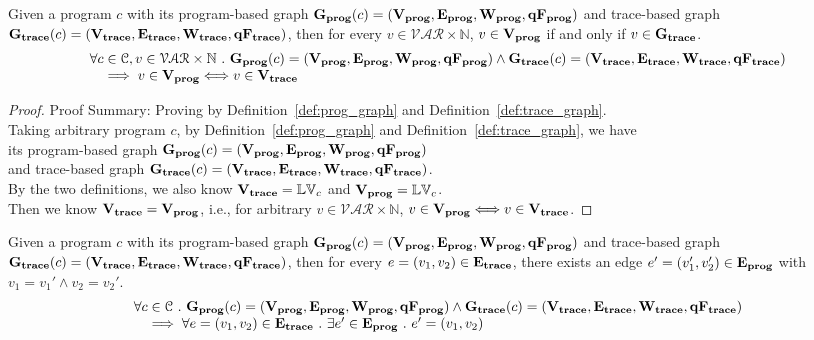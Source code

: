 	\begin{lem}
	\label{lem:vertex_map}
	Given a program $c$ with its
	program-based graph $\progG({c}) = (\progV, \progE, \progW, \progF)$
	and 
	trace-based graph $\traceG({c}) = (\traceV, \traceE, \traceW, \traceF)$,
	then for every $v \in \mathcal{VAR} \times \mathbb{N}$,
	$v \in \progV$ if and only if $v \in \traceG$.
	\[
	\begin{array}{l}
	\forall c \in \cdom , v \in \mathcal{VAR} \times \mathbb{N} \st 
	\progG({c}) = (\progV, \progE, \progW, \progF)
	\land 
	\traceG({c}) = (\traceV, \traceE, \traceW, \traceF)
	\\ \quad
	\implies
	v \in \progV \Longleftrightarrow v \in \traceV
	\end{array}
	\]
	\end{lem}
\begin{proof}
Proof Summary: Proving by Definition~\ref{def:prog_graph} and Definition~\ref{def:trace_graph}.
\\
Taking arbitrary program $c$,
by Definition~\ref{def:prog_graph} and Definition~\ref{def:trace_graph}, 
we have   
\\
its program-based graph $\progG({c}) = (\progV, \progE, \progW, \progF)$ 
\\
and 
trace-based graph $\traceG({c}) = (\traceV, \traceE, \traceW, \traceF)$.
\\
By the two definitions, we also know 
$\traceV  = \lvar_c$ and $\progV = \lvar_c$.
\\
Then we know $\traceV  = \progV$, i.e., 
for arbitrary $v \in \mathcal{VAR} \times \mathbb{N}$, $v \in \progV \Longleftrightarrow v \in \traceV$.
\end{proof}
%
	\begin{lem}
	\label{lem:edge_map}
	Given a program $c$ with its
	program-based graph $\progG({c}) = (\progV, \progE, \progW, \progF)$
	and 
	trace-based graph $\traceG({c}) = (\traceV, \traceE, \traceW, \traceF)$,
	then for every $e = (v_1, v_2) \in \traceE$, there exists an edge 
	$e' = (v_1', v_2') \in \progE$ with 
	$v_1 = v_1' \land v_2 = v_2'$.
	\[
	\begin{array}{l}
	\forall c \in \cdom \st
	 \progG({c}) = (\progV, \progE, \progW, \progF)
	\land 
	\traceG({c}) = (\traceV, \traceE, \traceW, \traceF)
	\\ \quad
	\implies
	\forall e = (v_1, v_2) \in \traceE
	\st 
	\exists e' \in \progE \st e' = (v_1, v_2)
	\end{array}
	\]
	\end{lem}
